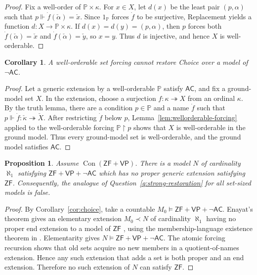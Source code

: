 \documentclass[11pt,a4paper]{amsart}
\newcommand{\VP}{\mathsf{VP}}
\newcommand{\AC}{\mathsf{AC}}
\newcommand{\ZF}{\mathsf{ZF}}
\newcommand{\Con}{\operatorname{Con}}
\theoremstyle{plain}
\newtheorem{proposition}[theorem]{Proposition}
\newtheorem{corollary}[theorem]{Corollary}
\theoremstyle{definition}
\theoremstyle{remark}
\begin{document}
\begin{proof}
Fix a well-order of $\mathbb P\times\kappa$.  For $x\in X$, let $d(x)$ be the least pair $(p,\alpha)$ such that $p\Vdash\dot f(\check\alpha)=\check x$.  Since $1_{\mathbb P}$ forces $\dot f$ to be surjective, Replacement yields a function $d:X\longrightarrow\mathbb P\times\kappa$.
If $d(x)=d(y)=(p,\alpha)$, then $p$ forces both $\dot f(\check\alpha)=\check x$ and $\dot f(\check\alpha)=\check y$, so $x=y$.  Thus $d$ is injective, and hence $X$ is well-orderable.
\end{proof}

\begin{corollary}\label{cor:wellorderable-no-choice-restoration}
A well-orderable set forcing cannot restore Choice over a model of $\neg\AC$.
\end{corollary}

\begin{proof}
Let a generic extension by a well-orderable $\mathbb P$ satisfy $\AC$, and fix a ground-model set $X$.  In the extension, choose a surjection $f:\kappa\twoheadrightarrow X$ from an ordinal $\kappa$.  By the truth lemma, there are a condition $p\in\mathbb P$ and a name $\dot f$ such that $p\Vdash\dot f:\check\kappa\twoheadrightarrow\check X$.  After restricting $\dot f$ below $p$, Lemma~\ref{lem:wellorderable-forcing} applied to the well-orderable forcing $\mathbb P\mathbin{\restriction}p$ shows that $X$ is well-orderable in the ground model.  Thus every ground-model set is well-orderable, and the ground model satisfies $\AC$.
\end{proof}

\begin{proposition}\label{prop:countability-essential}
Assume $\Con(\ZF+\VP)$.  There is a model $N$ of cardinality $\aleph_1$ satisfying $\ZF+\VP+\neg\AC$ which has no proper generic extension satisfying $\ZF$.  Consequently, the analogue of Question~\ref{q:strong-restoration} for all set-sized models is false.
\end{proposition}

\begin{proof}
By Corollary~\ref{cor:choice}, take a countable $M_0\models\ZF+\VP+\neg\AC$.  Enayat's theorem gives an elementary extension $M_0\prec N$ of cardinality $\aleph_1$ having no proper end extension to a model of $\ZF$ \cite[Theorem~5.18]{Enayat}, using the membership-language existence theorem in \cite[Theorem~5.1]{Supplement}.  Elementarity gives $N\models\ZF+\VP+\neg\AC$.  {The atomic forcing recursion shows that old sets acquire no new members in a quotient-of-names extension.  Hence any such extension that adds a set is both proper and an end extension.}  Therefore no such extension of $N$ can satisfy $\ZF$.
\end{proof}
\endgroup
\end{document}
